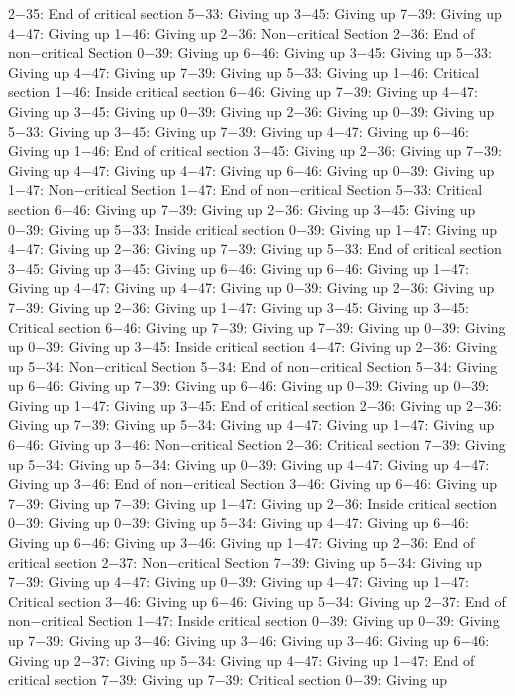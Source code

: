 2−35: End of critical section
5−33: Giving up
3−45: Giving up
7−39: Giving up
4−47: Giving up
1−46: Giving up
2−36: Non−critical Section
2−36: End of non−critical Section
0−39: Giving up
6−46: Giving up
3−45: Giving up
5−33: Giving up
4−47: Giving up
7−39: Giving up
5−33: Giving up
1−46: Critical section
1−46: Inside critical section
6−46: Giving up
7−39: Giving up
4−47: Giving up
3−45: Giving up
0−39: Giving up
2−36: Giving up
0−39: Giving up
5−33: Giving up
3−45: Giving up
7−39: Giving up
4−47: Giving up
6−46: Giving up
1−46: End of critical section
3−45: Giving up
2−36: Giving up
7−39: Giving up
4−47: Giving up
4−47: Giving up
6−46: Giving up
0−39: Giving up
1−47: Non−critical Section
1−47: End of non−critical Section
5−33: Critical section
6−46: Giving up
7−39: Giving up
2−36: Giving up
3−45: Giving up
0−39: Giving up
5−33: Inside critical section
0−39: Giving up
1−47: Giving up
4−47: Giving up
2−36: Giving up
7−39: Giving up
5−33: End of critical section
3−45: Giving up
3−45: Giving up
6−46: Giving up
6−46: Giving up
1−47: Giving up
4−47: Giving up
4−47: Giving up
0−39: Giving up
2−36: Giving up
7−39: Giving up
2−36: Giving up
1−47: Giving up
3−45: Giving up
3−45: Critical section
6−46: Giving up
7−39: Giving up
7−39: Giving up
0−39: Giving up
0−39: Giving up
3−45: Inside critical section
4−47: Giving up
2−36: Giving up
5−34: Non−critical Section
5−34: End of non−critical Section
5−34: Giving up
6−46: Giving up
7−39: Giving up
6−46: Giving up
0−39: Giving up
0−39: Giving up
1−47: Giving up
3−45: End of critical section
2−36: Giving up
2−36: Giving up
7−39: Giving up
5−34: Giving up
4−47: Giving up
1−47: Giving up
6−46: Giving up
3−46: Non−critical Section
2−36: Critical section
7−39: Giving up
5−34: Giving up
5−34: Giving up
0−39: Giving up
4−47: Giving up
4−47: Giving up
3−46: End of non−critical Section
3−46: Giving up
6−46: Giving up
7−39: Giving up
7−39: Giving up
1−47: Giving up
2−36: Inside critical section
0−39: Giving up
0−39: Giving up
5−34: Giving up
4−47: Giving up
6−46: Giving up
6−46: Giving up
3−46: Giving up
1−47: Giving up
2−36: End of critical section
2−37: Non−critical Section
7−39: Giving up
5−34: Giving up
7−39: Giving up
4−47: Giving up
0−39: Giving up
4−47: Giving up
1−47: Critical section
3−46: Giving up
6−46: Giving up
5−34: Giving up
2−37: End of non−critical Section
1−47: Inside critical section
0−39: Giving up
0−39: Giving up
7−39: Giving up
3−46: Giving up
3−46: Giving up
3−46: Giving up
6−46: Giving up
2−37: Giving up
5−34: Giving up
4−47: Giving up
1−47: End of critical section
7−39: Giving up
7−39: Critical section
0−39: Giving up
